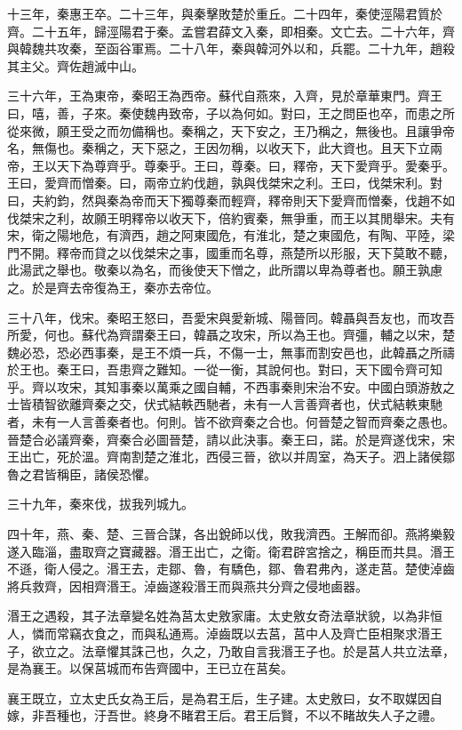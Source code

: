 十三年，秦惠王卒。二十三年，與秦擊敗楚於重丘。二十四年，秦使涇陽君質於齊。二十五年，歸涇陽君于秦。孟嘗君薛文入秦，即相秦。文亡去。二十六年，齊與韓魏共攻秦，至函谷軍焉。二十八年，秦與韓河外以和，兵罷。二十九年，趙殺其主父。齊佐趙滅中山。

三十六年，王為東帝，秦昭王為西帝。蘇代自燕來，入齊，見於章華東門。齊王曰，嘻，善，子來。秦使魏冉致帝，子以為何如。對曰，王之問臣也卒，而患之所從來微，願王受之而勿備稱也。秦稱之，天下安之，王乃稱之，無後也。且讓爭帝名，無傷也。秦稱之，天下惡之，王因勿稱，以收天下，此大資也。且天下立兩帝，王以天下為尊齊乎。尊秦乎。王曰，尊秦。曰，釋帝，天下愛齊乎。愛秦乎。王曰，愛齊而憎秦。曰，兩帝立約伐趙，孰與伐桀宋之利。王曰，伐桀宋利。對曰，夫約鈞，然與秦為帝而天下獨尊秦而輕齊，釋帝則天下愛齊而憎秦，伐趙不如伐桀宋之利，故願王明釋帝以收天下，倍約賓秦，無爭重，而王以其閒舉宋。夫有宋，衛之陽地危，有濟西，趙之阿東國危，有淮北，楚之東國危，有陶、平陸，梁門不開。釋帝而貸之以伐桀宋之事，國重而名尊，燕楚所以形服，天下莫敢不聽，此湯武之舉也。敬秦以為名，而後使天下憎之，此所謂以卑為尊者也。願王孰慮之。於是齊去帝復為王，秦亦去帝位。

三十八年，伐宋。秦昭王怒曰，吾愛宋與愛新城、陽晉同。韓聶與吾友也，而攻吾所愛，何也。蘇代為齊謂秦王曰，韓聶之攻宋，所以為王也。齊彊，輔之以宋，楚魏必恐，恐必西事秦，是王不煩一兵，不傷一士，無事而割安邑也，此韓聶之所禱於王也。秦王曰，吾患齊之難知。一從一衡，其說何也。對曰，天下國令齊可知乎。齊以攻宋，其知事秦以萬乘之國自輔，不西事秦則宋治不安。中國白頭游敖之士皆積智欲離齊秦之交，伏式結軼西馳者，未有一人言善齊者也，伏式結軼東馳者，未有一人言善秦者也。何則。皆不欲齊秦之合也。何晉楚之智而齊秦之愚也。晉楚合必議齊秦，齊秦合必圖晉楚，請以此決事。秦王曰，諾。於是齊遂伐宋，宋王出亡，死於溫。齊南割楚之淮北，西侵三晉，欲以并周室，為天子。泗上諸侯鄒魯之君皆稱臣，諸侯恐懼。

三十九年，秦來伐，拔我列城九。

四十年，燕、秦、楚、三晉合謀，各出銳師以伐，敗我濟西。王解而卻。燕將樂毅遂入臨淄，盡取齊之寶藏器。湣王出亡，之衛。衛君辟宮捨之，稱臣而共具。湣王不遜，衛人侵之。湣王去，走鄒、魯，有驕色，鄒、魯君弗內，遂走莒。楚使淖齒將兵救齊，因相齊湣王。淖齒遂殺湣王而與燕共分齊之侵地鹵器。

湣王之遇殺，其子法章變名姓為莒太史敫家庸。太史敫女奇法章狀貌，以為非恒人，憐而常竊衣食之，而與私通焉。淖齒既以去莒，莒中人及齊亡臣相聚求湣王子，欲立之。法章懼其誅己也，久之，乃敢自言我湣王子也。於是莒人共立法章，是為襄王。以保莒城而布告齊國中，王已立在莒矣。

襄王既立，立太史氏女為王后，是為君王后，生子建。太史敫曰，女不取媒因自嫁，非吾種也，汙吾世。終身不睹君王后。君王后賢，不以不睹故失人子之禮。

